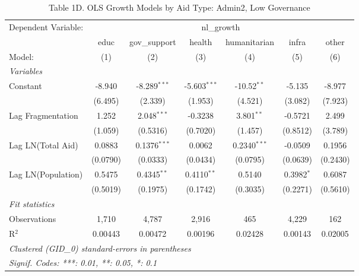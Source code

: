\begin{table}[H]
   \caption{Table 1D. OLS Growth Models by Aid Type: Admin2, Low Governance}
   \centering
   \begin{tabular}{lcccccc}
      \tabularnewline \midrule \midrule
      Dependent Variable: & \multicolumn{6}{c}{nl\_growth}\\
                         & educ     & gov\_support   & health         & humanitarian   & infra        & other \\   
      Model:             & (1)      & (2)            & (3)            & (4)            & (5)          & (6)\\  
      \midrule
      \emph{Variables}\\
      Constant           & -8.940   & -8.289$^{***}$ & -5.603$^{***}$ & -10.52$^{**}$  & -5.135       & -8.977\\   
                         & (6.495)  & (2.339)        & (1.953)        & (4.521)        & (3.082)      & (7.923)\\   
      Lag Fragmentation  & 1.252    & 2.048$^{***}$  & -0.3238        & 3.801$^{**}$   & -0.5721      & 2.499\\   
                         & (1.059)  & (0.5316)       & (0.7020)       & (1.457)        & (0.8512)     & (3.789)\\   
      Lag LN(Total Aid)  & 0.0883   & 0.1376$^{***}$ & 0.0062         & 0.2340$^{***}$ & -0.0509      & 0.1956\\   
                         & (0.0790) & (0.0333)       & (0.0434)       & (0.0795)       & (0.0639)     & (0.2430)\\   
      Lag LN(Population) & 0.5475   & 0.4345$^{**}$  & 0.4110$^{**}$  & 0.5140         & 0.3982$^{*}$ & 0.6087\\   
                         & (0.5019) & (0.1975)       & (0.1742)       & (0.3035)       & (0.2271)     & (0.5610)\\   
      \midrule
      \emph{Fit statistics}\\
      Observations       & 1,710    & 4,787          & 2,916          & 465            & 4,229        & 162\\  
      R$^2$              & 0.00443  & 0.00472        & 0.00196        & 0.02428        & 0.00143      & 0.02005\\  
      \midrule \midrule
      \multicolumn{7}{l}{\emph{Clustered (GID\_0) standard-errors in parentheses}}\\
      \multicolumn{7}{l}{\emph{Signif. Codes: ***: 0.01, **: 0.05, *: 0.1}}\\
   \end{tabular}
\end{table}



